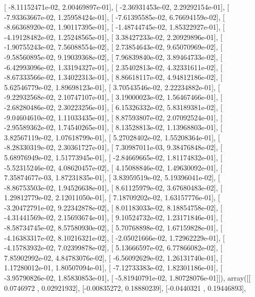 \documentclass{article}
\begin{document}
       [ -8.11152471e-02,   2.00469897e-01],
       [ -2.36931453e-02,   2.29292154e-01],
       [ -7.93363667e-02,   1.25958424e-01],
       [ -7.61395585e-02,   6.76694159e-02],
       [ -8.66368920e-02,   1.90117395e-01],
       [ -1.48744745e-02,   1.85322927e-01],
       [ -4.19128482e-02,   1.25248565e-01],
       [  3.38427233e-02,   2.20929896e-01],
       [ -1.90755243e-02,   7.56088554e-02],
       [  2.73854643e-02,   9.65070969e-02],
       [ -9.58560895e-02,   9.19039368e-02],
       [  7.96839840e-02,   3.89464733e-02],
       [ -6.42993096e-02,   1.33194327e-01],
       [  2.35402813e-02,   4.32331611e-02],
       [ -8.67333566e-02,   1.34022313e-01],
       [  8.86618117e-02,   4.94812186e-02],
       [  5.62546779e-02,   1.89698123e-01],
       [  3.70543546e-02,   2.22234882e-01],
       [ -9.22932568e-02,   2.10747107e-01],
       [  3.19000023e-02,   1.56467466e-01],
       [ -2.68280486e-02,   2.30223256e-01],
       [  6.15326332e-02,   5.83189381e-02],
       [ -9.04604610e-02,   1.11033435e-01],
       [  8.87593807e-02,   2.07092524e-01],
       [ -2.95589362e-02,   1.74540265e-01],
       [  8.13528813e-02,   1.13968803e-01],
       [  3.82567119e-02,   1.07618799e-01],
       [  5.27028402e-02,   1.55208364e-01],
       [ -8.28330319e-02,   2.30361727e-01],
       [  7.30987011e-03,   9.38476848e-02],
       [  5.68976949e-02,   1.51773945e-01],
       [ -2.84669665e-02,   1.81174832e-01],
       [ -5.52315246e-02,   4.08620457e-02],
       [  4.15088846e-02,   1.49630092e-01],
       [  7.35874677e-03,   1.87231835e-01],
       [  3.83959519e-02,   5.19396041e-02],
       [ -8.86753503e-02,   1.94526638e-01],
       [  8.61125979e-02,   3.67680483e-02],
       [  1.29812779e-02,   2.12011050e-01],
       [  7.18709202e-02,   1.63157776e-01],
       [ -3.20472791e-02,   9.22342878e-02],
       [  8.01183033e-02,   8.18854758e-02],
       [ -4.31441569e-02,   2.15693674e-01],
       [  9.10524732e-02,   1.23171846e-01],
       [ -8.58734745e-02,   8.57580930e-02],
       [  5.70768898e-02,   1.67159828e-01],
       [ -4.16383317e-02,   8.10216321e-02],
       [ -2.05021666e-02,   1.72962229e-01],
       [ -4.15783932e-02,   7.02399878e-02],
       [  5.13666597e-02,   6.77866082e-02],
       [  7.85902992e-02,   4.84783076e-02],
       [ -6.56092629e-02,   1.26131740e-01],
       [  1.17280012e-01,   1.80507094e-01],
       [ -7.12733383e-02,   1.82301186e-01],
       [ -3.95790826e-02,   1.85830853e-01],
       [ -5.81940791e-02,   1.80728076e-01]]), array([[ 0.0746972 ,  0.02921932],
       [-0.00835272,  0.18880239],
       [-0.0440321 ,  0.19446893],
\end{document}

